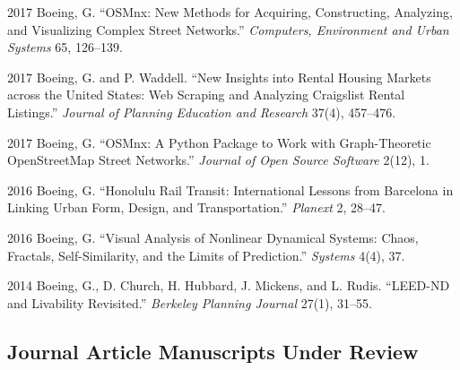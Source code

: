 \documentclass{academiccv}
\begin{document}
\begin{tablist}

\item[2017] \tab Boeing, G. \enquote{OSMnx: New Methods for Acquiring, Constructing, Analyzing, and Visualizing Complex Street Networks.} \textit{Computers, Environment and Urban Systems} 65, 126--139.

\item[2017] \tab Boeing, G. and P. Waddell. \enquote{New Insights into Rental Housing Markets across the United States: Web Scraping and Analyzing Craigslist Rental Listings.} \textit{Journal of Planning Education and Research} 37(4), 457--476.

\item[2017] \tab Boeing, G. \enquote{OSMnx: A Python Package to Work with Graph-Theoretic OpenStreetMap Street Networks.} \textit{Journal of Open Source Software} 2(12), 1.

\item[2016] \tab Boeing, G. \enquote{Honolulu Rail Transit: International Lessons from Barcelona in Linking Urban Form, Design, and Transportation.} \textit{Planext} 2, 28--47.

\item[2016] \tab Boeing, G. \enquote{Visual Analysis of Nonlinear Dynamical Systems: Chaos, Fractals, Self-Similarity, and the Limits of Prediction.} \textit{Systems} 4(4), 37.

\item[2014] \tab Boeing, G., D. Church, H. Hubbard, J. Mickens, and L. Rudis. \enquote{LEED-ND and Livability Revisited.} \textit{Berkeley Planning Journal} 27(1), 31--55.

\end{tablist}



\subsection*{Journal Article Manuscripts Under Review}
\end{document}

